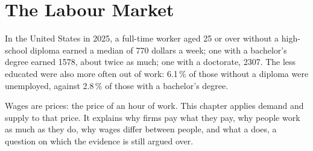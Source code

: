 \chapter{The Labour Market}\label{ch:g11:labour-market}

In the United States in 2025, a full-time worker aged 25 or over without a high-school diploma earned a median of 770 dollars a week; one with a bachelor's degree
earned 1578, about twice as much; one with a doctorate, 2307. The less educated were also more often out of work: 6.1\,\% of those without a diploma were unemployed,
against 2.8\,\% of those with a bachelor's degree.

Wages are prices: the price of an hour of work. This chapter applies demand and supply to that price. It explains why firms pay what they pay, why people work as much
as they do, why wages differ between people, and what a  does, a question on which the evidence is still argued over.

